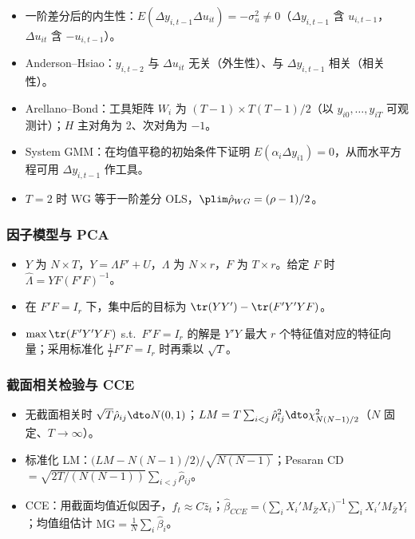 \begin{itemize}
  \item 一阶差分后的内生性：$E(\Delta y_{i,t-1}\Delta u_{it})=-\sigma_u^2\neq0$（$\Delta y_{i,t-1}$ 含 $u_{i,t-1}$，$\Delta u_{it}$ 含 $-u_{i,t-1}$）。
  \item Anderson--Hsiao：$y_{i,t-2}$ 与 $\Delta u_{it}$ 无关（外生性）、与 $\Delta y_{i,t-1}$ 相关（相关性）。
  \item Arellano--Bond：工具矩阵 $W_i$ 为 $(T-1)\times T(T-1)/2$（以 $y_{i0},\dots,y_{iT}$ 可观测计）；$H$ 主对角为 2、次对角为 $-1$。
  \item System GMM：在均值平稳的初始条件下证明 $E(\alpha_i\Delta y_{i1})=0$，从而水平方程可用 $\Delta y_{i,t-1}$ 作工具。
  \item $T=2$ 时 WG 等于一阶差分 OLS，$\plim\hat\rho_{WG}=(\rho-1)/2$。
\end{itemize}

\subsubsection{因子模型与 PCA}

\begin{itemize}
  \item $Y$ 为 $N\times T$，$Y=\Lambda F'+U$，$\Lambda$ 为 $N\times r$，$F$ 为 $T\times r$。给定 $F$ 时 $\hat\Lambda=YF(F'F)^{-1}$。
  \item 在 $F'F=I_r$ 下，集中后的目标为 $\tr(YY')-\tr(F'Y'YF)$。
  \item $\max\tr(F'Y'YF)$ s.t.\ $F'F=I_r$ 的解是 $Y'Y$ 最大 $r$ 个特征值对应的特征向量；采用标准化 $\frac1TF'F=I_r$ 时再乘以 $\sqrt T$。
\end{itemize}

\subsubsection{截面相关检验与 CCE}

\begin{itemize}
  \item 无截面相关时 $\sqrt T\hat\rho_{ij}\dto N(0,1)$；$LM=T\sum_{i<j}\hat\rho_{ij}^2\dto\chi^2_{N(N-1)/2}$（$N$ 固定、$T\to\infty$）。
  \item 标准化 LM：$\bigl(LM-N(N-1)/2\bigr)/\sqrt{N(N-1)}$；Pesaran CD $=\sqrt{2T/(N(N-1))}\sum_{i<j}\hat\rho_{ij}$。
  \item CCE：用截面均值近似因子，$f_t\approx C\bar z_t$；$\hat\beta_{CCE}=\bigl(\sum_iX_i'M_{\bar Z}X_i\bigr)^{-1}\sum_iX_i'M_{\bar Z}Y_i$；均值组估计 $\text{MG}=\frac1N\sum_i\hat\beta_i$。
\end{itemize}

